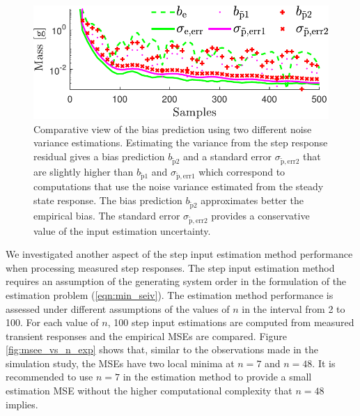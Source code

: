 \begin{figure}[!htb]
\centering
\includegraphics[width=0.69\columnwidth]{./ChapterExperimentalValidation/fig/Fig_11.pdf} 
\caption{ \label{fig:b_sigma_exp_str2} 
Comparative view of the bias prediction using two different noise variance estimations. 
Estimating the variance from the step response residual gives a bias prediction $b_{\widetilde{\mathrm{p}}2}$ and a standard error $\sigma_{\widetilde{\mathrm{p}}\mathrm{,err2}}$ that are slightly higher than $b_{\widetilde{\mathrm{p}}1}$ and $\sigma_{\widetilde{\mathrm{p}}\mathrm{,err1}}$ which correspond to computations that use the noise variance estimated from the steady state response. 
The bias prediction $b_{\widetilde{\mathrm{p}}2}$ approximates better the empirical bias. 
The standard error $\sigma_{\widetilde{\mathrm{p}}\mathrm{,err2}}$ provides a conservative value of the input estimation uncertainty. }
\end{figure}


We investigated another aspect of the step input estimation method performance when processing measured step responses.
The step input estimation method requires an assumption of the generating system order in the formulation of the estimation problem (\ref{eqn:min_seiv}).
The estimation method performance is assessed under different assumptions of the values of $n$ in the interval from 2 to 100. 
For each value of $n$, 100 step input estimations are computed from measured transient responses and the empirical MSEs are compared.
Figure \ref{fig:msee_vs_n_exp} shows that, similar to the observations made in the simulation study, the MSEs have two local minima at $n=7$ and $n=48$.
It is recommended to use $n = 7$ in the estimation method to provide a small estimation MSE without the higher computational complexity that $n=48$ implies.


